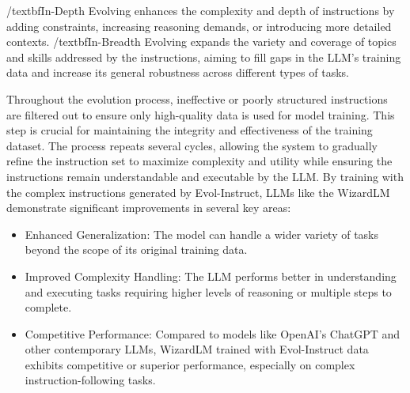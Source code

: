 \begin{itemize}
{	      /textbf{In-Depth Evolving} enhances the complexity and depth of instructions by adding constraints, increasing reasoning demands, or introducing more detailed contexts.
	      /textbf{In-Breadth Evolving} expands the variety and coverage of topics and skills addressed by the instructions, aiming to fill gaps in the LLM’s training data and increase its general robustness across different types of tasks.

	      Throughout the evolution process, ineffective or poorly structured instructions are filtered out to ensure only high-quality data is used for model training. This step is crucial for maintaining the integrity and effectiveness of the training dataset.
	      The process repeats several cycles, allowing the system to gradually refine the instruction set to maximize complexity and utility while ensuring the instructions remain understandable and executable by the LLM.
	      By training with the complex instructions generated by Evol-Instruct, LLMs like the WizardLM demonstrate significant improvements in several key areas:
	      \begin{itemize}
		      \item Enhanced Generalization: The model can handle a wider variety of tasks beyond the scope of its original training data.
		      \item Improved Complexity Handling: The LLM performs better in understanding and executing tasks requiring higher levels of reasoning or multiple steps to complete.
		      \item Competitive Performance: Compared to models like OpenAI's ChatGPT and other contemporary LLMs, WizardLM trained with Evol-Instruct data exhibits competitive or superior performance, especially on complex instruction-following tasks.
	      \end{itemize}
	      }
\end{itemize}


